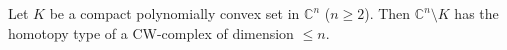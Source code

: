 
Let $K$ be a compact polynomially convex set in $\mathbb{C}^n$ ($n \geq 2$). Then $\mathbb{C}^n \setminus K$ has the homotopy type of a CW-complex of dimension $\leq n$.
